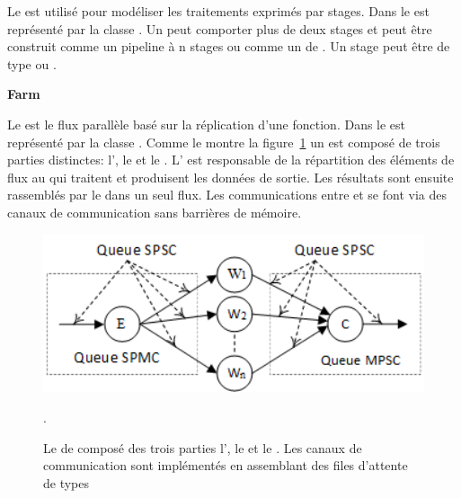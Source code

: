 Le  est utilis\'e pour mod\'eliser les traitements exprim\'es par stages. Dans  le  est repr\'esent\'e par la classe . Un  peut comporter plus de deux stages et peut \^etre construit comme un pipeline \`a n stages ou comme un  de . Un stage peut \^etre de type  ou .


\textbf{Farm}

Le  est le flux parall\`ele bas\'e sur la r\'eplication d'une fonction. Dans  le  est repr\'esent\'e par la classe . Comme le montre la figure~\ref{FastFlowFarm.fig} un  est compos\'e de trois parties distinctes: l', le  et le . L' est responsable de la r\'epartition des \'el\'ements de flux au  qui traitent et produisent les donn\'ees de sortie. Les r\'esultats sont ensuite rassembl\'es par le  dans un seul flux. Les communications entre  et  se font via des canaux de communication sans barri\`eres de m\'emoire.

\begin{figure}[ht]
\centering
     \includegraphics[width=1.0\textwidth]{Figures/FastFlowFarm.png}
      \caption{Le  de  compos\'e des trois parties l', le  et le . Les canaux de communication sont impl\'ement\'es en assemblant des files d'attente de types }.
       \label{FastFlowFarm.fig}
\end{figure}